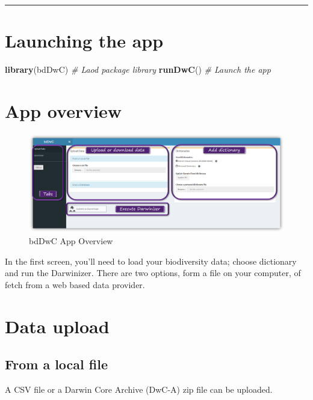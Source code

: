 \documentclass[]{book}
\newenvironment{Shaded}{\begin{snugshade}}{\end{snugshade}}
\newcommand{\KeywordTok}[1]{\textcolor[rgb]{0.13,0.29,0.53}{\textbf{#1}}}
\newcommand{\CommentTok}[1]{\textcolor[rgb]{0.56,0.35,0.01}{\textit{#1}}}
\newcommand{\NormalTok}[1]{#1}
\theoremstyle{definition}
\theoremstyle{definition}
\theoremstyle{definition}
\theoremstyle{remark}
\begin{document}
\begin{center}\rule{0.5\linewidth}{\linethickness}\end{center}

\section{Launching the app}\label{launching-the-app}

\begin{Shaded}
\begin{Highlighting}[]
\KeywordTok{library}\NormalTok{(bdDwC) }\CommentTok{# Laod package library}
\KeywordTok{runDwC}\NormalTok{() }\CommentTok{# Launch the app}
\end{Highlighting}
\end{Shaded}

\section{App overview}\label{app-overview}

\begin{figure}
\centering
\includegraphics{img/bdDwC_Getting_started.png}
\caption{bdDwC App Overview}
\end{figure}

In the first screen, you'll need to load your biodiversity data; choose
dictionary and run the Darwinizer. There are two options, form a file on
your computer, of fetch from a web based data provider.

\section{Data upload}\label{data-upload}

\subsection{From a local file}\label{from-a-local-file}

A CSV file or a Darwin Core Archive (DwC-A) zip file can be uploaded.
\end{document}

